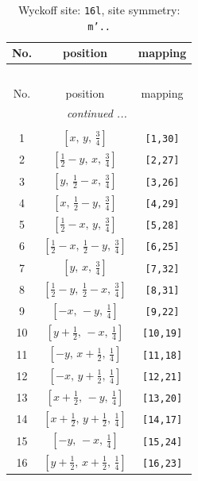 \documentclass[fleqn,8pt]{jsarticle}
\begin{document}
\renewcommand{\arraystretch}{1.2}
\begin{longtable}{ccc}
\caption{Wyckoff site: {\tt 16l}, site symmetry: {\tt m'..}}
 \\
 \hline \hline
No. & position & mapping \\ \hline \endfirsthead

\multicolumn{2}{l}{\tablename\ \thetable{}} \\
 \hline \hline
No. & position & mapping \\ \hline \endhead

 \hline \hline
\multicolumn{2}{r}{\footnotesize\it continued ...} \\ \endfoot

 \hline \hline
\multicolumn{2}{r}{} \\ \endlastfoot

1 & $\left[ x,\, y,\, \frac{3}{4} \right]$ & {\tt [1,30]} \\ \hline
2 & $\left[ \frac{1}{2} - y,\, x,\, \frac{3}{4} \right]$ & {\tt [2,27]} \\ \hline
3 & $\left[ y,\, \frac{1}{2} - x,\, \frac{3}{4} \right]$ & {\tt [3,26]} \\ \hline
4 & $\left[ x,\, \frac{1}{2} - y,\, \frac{3}{4} \right]$ & {\tt [4,29]} \\ \hline
5 & $\left[ \frac{1}{2} - x,\, y,\, \frac{3}{4} \right]$ & {\tt [5,28]} \\ \hline
6 & $\left[ \frac{1}{2} - x,\, \frac{1}{2} - y,\, \frac{3}{4} \right]$ & {\tt [6,25]} \\ \hline
7 & $\left[ y,\, x,\, \frac{3}{4} \right]$ & {\tt [7,32]} \\ \hline
8 & $\left[ \frac{1}{2} - y,\, \frac{1}{2} - x,\, \frac{3}{4} \right]$ & {\tt [8,31]} \\ \hline
9 & $\left[ - x,\, - y,\, \frac{1}{4} \right]$ & {\tt [9,22]} \\ \hline
10 & $\left[ y + \frac{1}{2},\, - x,\, \frac{1}{4} \right]$ & {\tt [10,19]} \\ \hline
11 & $\left[ - y,\, x + \frac{1}{2},\, \frac{1}{4} \right]$ & {\tt [11,18]} \\ \hline
12 & $\left[ - x,\, y + \frac{1}{2},\, \frac{1}{4} \right]$ & {\tt [12,21]} \\ \hline
13 & $\left[ x + \frac{1}{2},\, - y,\, \frac{1}{4} \right]$ & {\tt [13,20]} \\ \hline
14 & $\left[ x + \frac{1}{2},\, y + \frac{1}{2},\, \frac{1}{4} \right]$ & {\tt [14,17]} \\ \hline
15 & $\left[ - y,\, - x,\, \frac{1}{4} \right]$ & {\tt [15,24]} \\ \hline
16 & $\left[ y + \frac{1}{2},\, x + \frac{1}{2},\, \frac{1}{4} \right]$ & {\tt [16,23]} \\
\end{longtable}
\end{document}

